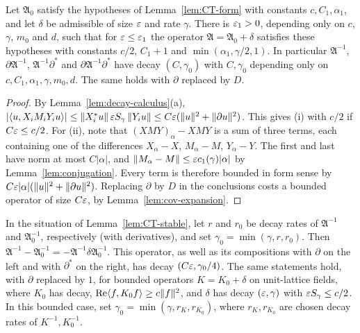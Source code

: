 \begin{lemma}\label{lem:CT-stable}
Let $\mathfrak A_0$ satisfy the hypotheses of Lemma~\ref{lem:CT-form} with constants $c,C_1,\alpha_1$, and let $\delta$ be admissible of size $\varepsilon$ and rate $\gamma$. There is $\varepsilon_1>0$, depending only on $c$, $\gamma$, $m_0$ and $d$, such that for $\varepsilon\le\varepsilon_1$ the operator $\mathfrak A=\mathfrak A_0+\delta$ satisfies these hypotheses with constants $c/2$, $C_1+1$ and $\min(\alpha_1,\gamma/2,1)$. In particular $\mathfrak A^{-1}$, $\partial\mathfrak A^{-1}$, $\mathfrak A^{-1}\partial^*$ and $\partial\mathfrak A^{-1}\partial^*$ have decay $(C,\gamma_0)$ with $C,\gamma_0$ depending only on $c,C_1,\alpha_1,\gamma,m_0,d$. The same holds with $\partial$ replaced by $D$.
\end{lemma}

\begin{proof}
By Lemma~\ref{lem:decay-calculus}(a), $|\langle u,X_iM_iY_iu\rangle|\le\|X_i^*u\|\,\varepsilon S_\gamma\,\|Y_iu\|\le C\varepsilon(\|u\|^2+\|\partial u\|^2)$. This gives (i) with $c/2$ if $C\varepsilon\le c/2$. For (ii), note that $(XMY)_\alpha-XMY$ is a sum of three terms, each containing one of the differences $X_\alpha-X$, $M_\alpha-M$, $Y_\alpha-Y$. The first and last have norm at most $C|\alpha|$, and $\|M_\alpha-M\|\le\varepsilon c_1(\gamma)|\alpha|$ by Lemma~\ref{lem:conjugation}. Every term is therefore bounded in form sense by $C\varepsilon|\alpha|(\|u\|^2+\|\partial u\|^2)$. Replacing $\partial$ by $D$ in the conclusions costs a bounded operator of size $C\varepsilon$, by Lemma~\ref{lem:cov-expansion}.
\end{proof}

\begin{lemma}\label{lem:perturbed-inverse}
In the situation of Lemma~\ref{lem:CT-stable}, let $r$ and $r_0$ be decay rates of $\mathfrak A^{-1}$ and $\mathfrak A_0^{-1}$, respectively (with derivatives), and set $\gamma_0=\min(\gamma,r,r_0)$. Then $\mathfrak A^{-1}-\mathfrak A_0^{-1}=-\mathfrak A^{-1}\delta\mathfrak A_0^{-1}$. This operator, as well as its compositions with $\partial$ on the left and with $\partial^*$ on the right, has decay $(C\varepsilon,\gamma_0/4)$. The same statements hold, with $\partial$ replaced by $1$, for bounded operators $K=K_0+\delta$ on unit-lattice fields, where $K_0$ has decay, $\operatorname{Re}\langle f,K_0f\rangle\ge c\|f\|^2$, and $\delta$ has decay $(\varepsilon,\gamma)$ with $\varepsilon S_\gamma\le c/2$. In this bounded case, set $\gamma_0=\min(\gamma,r_K,r_{K_0})$, where $r_K,r_{K_0}$ are chosen decay rates of $K^{-1},K_0^{-1}$.
\end{lemma}

